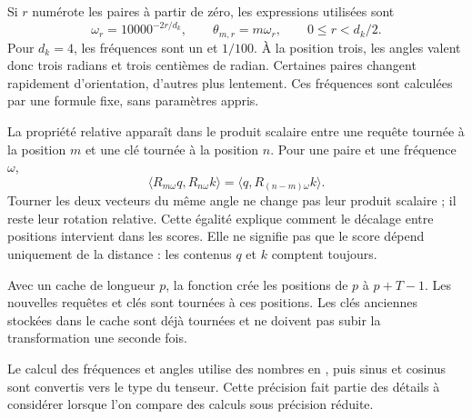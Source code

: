 
Si $r$ numérote les paires à partir de zéro, les expressions utilisées sont
\[
 \omega_r=10000^{-2r/d_k},\qquad
 \theta_{m,r}=m\omega_r,\qquad 0\leq r<d_k/2.
\]
Pour $d_k=4$, les fréquences sont un et $1/100$. À la position trois, les angles valent donc trois radians et trois centièmes de radian. Certaines paires changent rapidement d'orientation, d'autres plus lentement. Ces fréquences sont calculées par une formule fixe, sans paramètres appris.

La propriété relative apparaît dans le produit scalaire entre une requête tournée à la position $m$ et une clé tournée à la position $n$. Pour une paire et une fréquence $\omega$,
\[
 \langle R_{m\omega}q,R_{n\omega}k\rangle
 =\langle q,R_{(n-m)\omega}k\rangle.
\]
Tourner les deux vecteurs du même angle ne change pas leur produit scalaire ; il reste leur rotation relative. Cette égalité explique comment le décalage entre positions intervient dans les scores. Elle ne signifie pas que le score dépend uniquement de la distance : les contenus $q$ et $k$ comptent toujours.

Avec un cache de longueur $p$, la fonction crée les positions de $p$ à $p+T-1$. Les nouvelles requêtes et clés sont tournées à ces positions. Les clés anciennes stockées dans le cache sont déjà tournées et ne doivent pas subir la transformation une seconde fois.

Le calcul des fréquences et angles utilise des nombres en , puis sinus et cosinus sont convertis vers le type du tenseur. Cette précision fait partie des détails à considérer lorsque l'on compare des calculs sous précision réduite.




